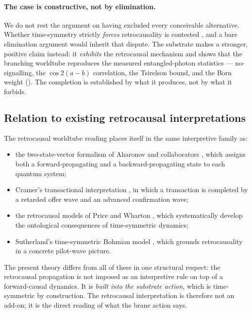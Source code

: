 \paragraph{The case is constructive, not by elimination.}
We do not rest the argument on having excluded every conceivable alternative. Whether
time-symmetry strictly \emph{forces} retrocausality is contested
\citep{LeiferPusey2017,WoodSpekkens2015}, and a bare elimination argument would inherit that
dispute. The substrate makes a stronger, positive claim instead: it \emph{exhibits} the
retrocausal mechanism and shows that the branching worldtube reproduces the measured
entangled-photon statistics --- no-signalling, the $\cos 2(a-b)$ correlation, the Tsirelson bound,
and the Born weight (). The completion is established by what it
produces, not by what it forbids.

\subsection{Relation to existing retrocausal interpretations}

The retrocausal worldtube reading places itself in the same interpretive family as:
\begin{itemize}
  \item the two-state-vector formalism of Aharonov and collaborators
  \citep{AharonovBergmannLebowitz1964,Aharonov2008TSVF}, which assigns both a forward-propagating
  and a backward-propagating state to each quantum system;
  \item Cramer's transactional interpretation \citep{Cramer1986TI}, in which a transaction is
  completed by a retarded offer wave and an advanced confirmation wave;
  \item the retrocausal models of Price and Wharton \citep{PriceWharton2015Retrocausality}, which
  systematically develop the ontological consequences of time-symmetric dynamics;
  \item Sutherland's time-symmetric Bohmian model \citep{Sutherland2017}, which grounds
  retrocausality in a concrete pilot-wave picture.
\end{itemize}
The present theory differs from all of these in one structural respect: the retrocausal
propagation is not imposed as an interpretive rule on top of a forward-causal dynamics.
It is \emph{built into the substrate action}, which is time-symmetric by construction.
The retrocausal interpretation is therefore not an add-on; it is the direct reading of what the
brane action says.